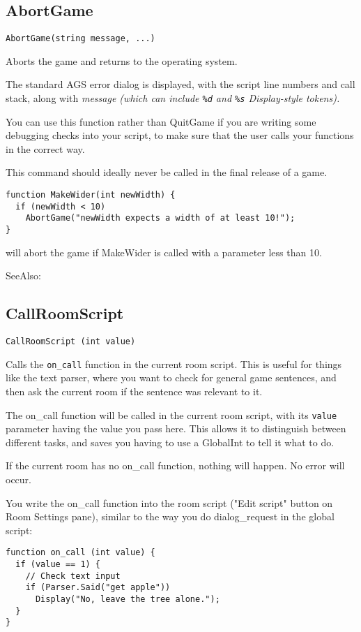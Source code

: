 \subsection{AbortGame}\label{AbortGame}%

\begin{verbatim}
AbortGame(string message, ...)
\end{verbatim}
Aborts the game and returns to the operating system.

The standard AGS error dialog is displayed, with the script line numbers and call stack,
along with \it{message} (which can include \verb$%d$ and \verb$%s$ Display-style tokens).

You can use this function rather than QuitGame if you are writing some debugging checks
into your script, to make sure that the user calls your functions in the correct way.

This command should ideally never be called in the final release of a game.

\begin{verbatim}
function MakeWider(int newWidth) {
  if (newWidth < 10)
    AbortGame("newWidth expects a width of at least 10!");
}
\end{verbatim}
will abort the game if MakeWider is called with a parameter less than 10.

SeeAlso: 


\subsection{CallRoomScript}\label{CallRoomScript}%

\begin{verbatim}
CallRoomScript (int value)
\end{verbatim}

Calls the \verb$on_call$ function in the current room script. This is useful for things
like the text parser, where you want to check for general game sentences, and then ask
the current room if the sentence was relevant to it.

The on_call function will be called in the current room script, with its \verb$value$
parameter having the value you pass here. This allows it to distinguish between different
tasks, and saves you having to use a GlobalInt to tell it what to do.

If the current room has no on_call function, nothing will happen. No error will occur.

You write the on_call function into the room script ("Edit script" button on Room Settings
pane), similar to the way you do dialog_request in the global script:
\begin{verbatim}
function on_call (int value) {
  if (value == 1) {
    // Check text input
    if (Parser.Said("get apple"))
      Display("No, leave the tree alone.");
  }
}
\end{verbatim}

